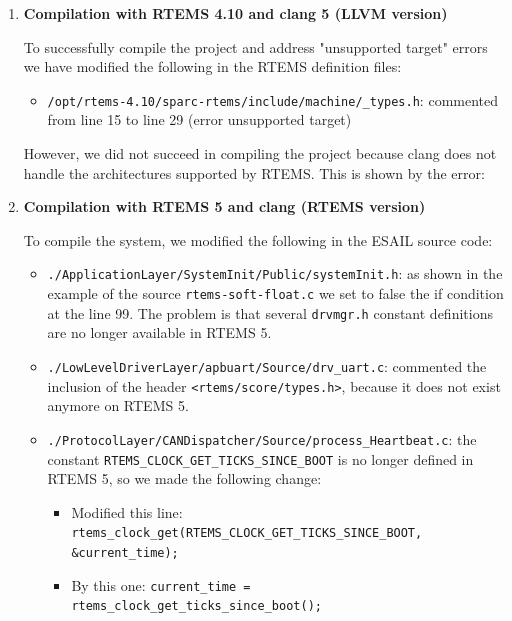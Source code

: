 \begin{enumerate}
	\item \textbf{Compilation with RTEMS 4.10 and clang 5 (LLVM version)}

	To successfully compile the project and address "unsupported target" errors we have modified the following in the RTEMS definition files:

	\begin{itemize}
		\item \texttt{/opt/rtems-4.10/sparc-rtems/include/machine/\_types.h}: commented from line 15 to line 29 (error unsupported target)
	\end{itemize}

	However, we did not succeed in compiling the project because clang does not handle the architectures supported by RTEMS. This is shown by the error:

	

	\item \textbf{Compilation with RTEMS 5 and clang (RTEMS version)}

	To compile the system, we modified the following in the ESAIL source code:

	\begin{itemize}
		\item \texttt{./ApplicationLayer/SystemInit/Public/systemInit.h}: as shown in the example of the source \texttt{rtems-soft-float.c} we set to false the if condition at the line 99. The problem is that several \texttt{drvmgr.h} constant definitions are no longer available in RTEMS 5.

		\item \texttt{./LowLevelDriverLayer/apbuart/Source/drv\_uart.c}: commented the inclusion of the header \texttt{\textless rtems/score/types.h\textgreater}, because it does not exist anymore on RTEMS 5.

		\item \texttt{./ProtocolLayer/CANDispatcher/Source/process\_Heartbeat.c}: the constant \linebreak \texttt{RTEMS\_CLOCK\_GET\_TICKS\_SINCE\_BOOT} is no longer defined in RTEMS 5, so we made the following change:

		\begin{itemize}
			\item Modified this line: \texttt{rtems\_clock\_get(RTEMS\_CLOCK\_GET\_TICKS\_SINCE\_BOOT, \&current\_time);}
			\item By this one:        \texttt{current\_time = rtems\_clock\_get\_ticks\_since\_boot();}
		\end{itemize}


\end{itemize}
\end{enumerate}
